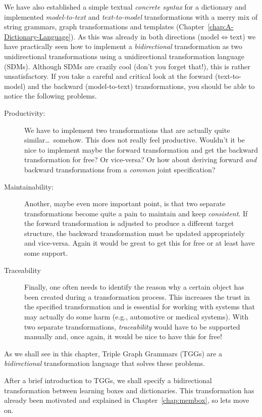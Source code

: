 We have also established a simple textual \emph{concrete syntax} for a dictionary and implemented \emph{model-to-text} and \emph{text-to-model} transformations with a merry mix of string grammars, graph transformations and templates (Chapter~\ref{chap:A-Dictionary-Language}).
As this was already in both directions (model$\Leftrightarrow$text) we have practically seen how to implement a \emph{bidirectional} transformation as two unidirectional transformations using a unidirectional transformation language (SDMs).
Although SDMs are crazily cool (don't you forget that!), this is rather unsatisfactory.  
If you take a careful and critical look at the forward (text-to-model) and the backward (model-to-text) transformations, you should be able to notice the following problems.
\begin{description}
  \item[Productivity:] We have to implement two transformations that are actually quite similar\ldots ~somehow.  This does not really feel productive.  Wouldn't it be nice to implement maybe the forward transformation and get the backward transformation for free?  Or vice-versa?  Or how about deriving forward \emph{and} backward transformations from a \emph{common} joint specification?
  \item[Maintainability:] Another, maybe even more important point, is that two separate transformations become quite a pain to maintain and keep \emph{consistent}.  If the forward transformation is adjusted to produce a different target structure, the backward transformation must be updated appropriately and vice-versa.  Again it would be great to get this for free or at least have some support.
  \item[Traceability] Finally, one often needs to identify the reason why a certain object has been created during a transformation process. 
This increases the trust in the specified transformation and is essential for working with systems that may actually do some harm (e.g., automotive or medical systems). 
With two separate transformations, \emph{traceability} would have to be supported manually and, once again, it would be nice to have this for free!
\end{description}

As we shall see in this chapter, Triple Graph Grammars (TGGs) are a \emph{bidirectional} transformation language that solves these problems.

After a brief introduction to TGGs, we shall specify a bidirectional transformation between learning boxes and dictionaries.
This transformation has already been motivated and explained in Chapter~\ref{chap:membox}, so lets move on. 